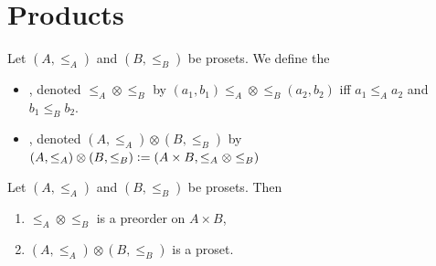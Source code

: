 \documentclass{book}
\begin{document}
	
	
	
	
	
	
	
	
	
	
	
	
	
	
	
	
	
	
	
	
	
	
	
	
	
	
	
	
	
	
	
	
	
	
	
	
	
	
	
	
	
	
	
	
	
	
	
	\section{Products}
	
	\begin{defn} 
		Let $(A, \leq_A)$ and $(B, \leq_B)$ be prosets. We define the 
		\begin{itemize}
			\item {}, denoted $\leq_A \otimes \leq_B$ by $(a_1,b_1) \leq_A \otimes \leq_B (a_2, b_2)$ iff $a_1 \leq_A a_2$ and $b_1 \leq_B b_2$.
			\item {}, denoted $(A, \leq_A) \otimes (B, \leq_B)$ by $(A, \leq_A) \otimes (B, \leq_B) \vcentcolon= (A \times B, \leq_A \otimes \leq_B)$
		\end{itemize}
	\end{defn}
	
	\begin{ex} 
		Let $(A, \leq_A)$ and $(B, \leq_B)$ be prosets. Then 
		\begin{enumerate}
			\item $\leq_A \otimes \leq_B$ is a preorder on $A \times B$,
			\item $(A, \leq_A) \otimes (B, \leq_B)$ is a proset.
		\end{enumerate}
	\end{ex}
	
\end{document}
